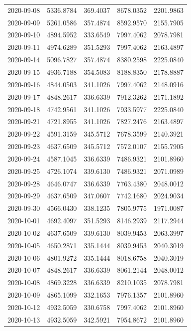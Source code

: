 \begin{footnotesize}
\begin{longtable}{lllll}
2020-09-08 & 5336.8784 & 369.4037 & 8678.0352 & 2201.9863 \\
2020-09-09 & 5261.0586 & 357.4874 & 8592.9570 & 2155.7905 \\
2020-09-10 & 4894.5952 & 333.6549 & 7997.4062 & 2078.7981 \\
2020-09-11 & 4974.6289 & 351.5293 & 7997.4062 & 2163.4897 \\
2020-09-14 & 5096.7827 & 357.4874 & 8380.2598 & 2225.0840 \\
2020-09-15 & 4936.7188 & 354.5083 & 8188.8350 & 2178.8887 \\
2020-09-16 & 4844.0503 & 341.1026 & 7997.4062 & 2148.0916 \\
2020-09-17 & 4848.2617 & 336.6339 & 7912.3262 & 2171.1892 \\
2020-09-18 & 4742.9561 & 341.1026 & 7933.5977 & 2225.0840 \\
2020-09-21 & 4721.8955 & 341.1026 & 7827.2476 & 2163.4897 \\
2020-09-22 & 4591.3159 & 345.5712 & 7678.3599 & 2140.3921 \\
2020-09-23 & 4637.6509 & 345.5712 & 7572.0107 & 2155.7905 \\
2020-09-24 & 4587.1045 & 336.6339 & 7486.9321 & 2101.8960 \\
2020-09-25 & 4726.1074 & 339.6130 & 7486.9321 & 2071.0989 \\
2020-09-28 & 4646.0747 & 336.6339 & 7763.4380 & 2048.0012 \\
2020-09-29 & 4637.6509 & 347.0607 & 7742.1680 & 2024.9034 \\
2020-09-30 & 4566.0430 & 338.1235 & 7805.9775 & 1971.0087 \\
2020-10-01 & 4692.4097 & 351.5293 & 8146.2939 & 2117.2944 \\
2020-10-02 & 4637.6509 & 339.6130 & 8039.9453 & 2063.3997 \\
2020-10-05 & 4650.2871 & 335.1444 & 8039.9453 & 2040.3019 \\
2020-10-06 & 4801.9272 & 335.1444 & 8018.6758 & 2040.3019 \\
2020-10-07 & 4848.2617 & 336.6339 & 8061.2144 & 2048.0012 \\
2020-10-08 & 4869.3228 & 336.6339 & 8210.1035 & 2078.7981 \\
2020-10-09 & 4865.1099 & 332.1653 & 7976.1357 & 2101.8960 \\
2020-10-12 & 4932.5059 & 330.6758 & 7997.4062 & 2101.8960 \\
2020-10-13 & 4932.5059 & 342.5921 & 7954.8672 & 2101.8960 \\

\end{longtable}
\end{footnotesize}
